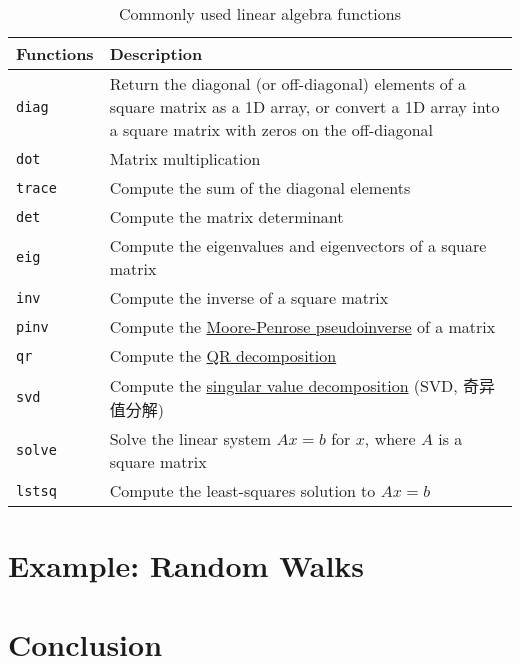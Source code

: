 \begin{table}
    \caption{Commonly used linear algebra functions}
    \label{Commonly used linear algebra functions}
    \begin{tabularx}{\textwidth}{lX}
        \hline
        Functions    & Description                                                                                                                                                \\
        \hline
        \verb|diag|  & Return the diagonal (or off-diagonal) elements of a square matrix as a 1D array, or convert a 1D array into a square matrix with zeros on the off-diagonal \\
        \verb|dot|   & Matrix multiplication                                                                                                                                      \\
        \verb|trace| & Compute the sum of the diagonal elements                                                                                                                   \\
        \verb|det|   & Compute the matrix determinant                                                                                                                             \\
        \verb|eig|   & Compute the eigenvalues and eigenvectors of a square matrix                                                                                                \\
        \verb|inv|   & Compute the inverse of a square matrix                                                                                                                     \\
        \verb|pinv|  & Compute the \href{https://en.wikipedia.org/wiki/Moore-Penrose_inverse}{Moore-Penrose pseudoinverse} of a matrix                                                                                                        \\
        \verb|qr|    & Compute the \href{https://en.wikipedia.org/wiki/QR_decomposition}{QR decomposition}                                                                                                                               \\
        \verb|svd|   & Compute the \href{https://en.wikipedia.org/wiki/Singular_value_decomposition}{singular value decomposition} (SVD, 奇异值分解)                                                                                                             \\
        \verb|solve| & Solve the linear system $Ax = b$ for $x$, where $A$ is a square matrix                                                                                     \\
        \verb|lstsq| & Compute the least-squares solution to $Ax = b$                                                                                                             \\
        \hline
    \end{tabularx}
\end{table}

\section{Example: Random Walks}
\section{Conclusion}